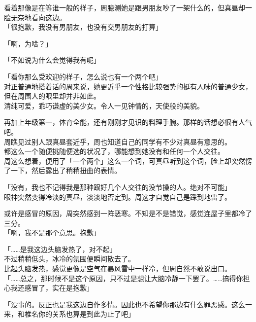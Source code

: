 看着那像是在等谁一般的样子，周臆测她是跟男朋友吵了一架什么的，但真昼却一脸无奈地看向这边。\\

「很抱歉，我没有男朋友，也没有交男朋友的打算」

「啊，为啥？」

「不如说为什么会觉得我有呢」

「看你那么受欢迎的样子，怎么说也有一个两个吧」\\

对正普通地搭着话的周来说，她更近乎一个性格比较强势的挺有人味的普通少女，但在周围人的眼里却并非如此。\\

清纯可爱，乖巧谦虚的美少女。令人一见钟情的，天使般的美貌。

再加上年级第一，体育全能，还有刚刚才见识的料理手腕。那样的话想必很有人气吧。\\

周瞧见过别人跟真昼套近乎，周也知道自己的同学有不少对真昼有意思的。\\

都这么一个随便挑随便选的状况了，哪能想到她没有和任何一个人交往。\\

周这么想着，便用了「一个两个」这么一个词，可真昼听到这个词，脸上却突然愣了一下，然后露出了稍稍扭曲的表情。

「没有，我也不记得我是那种跟好几个人交往的没节操的人。绝对不可能」\\

眼神突然变得冷淡的真昼，淡淡地否定到。周这才自觉自己是踩到地雷了。

或许是感冒的原因，周突然感到一阵恶寒。不知是不是错觉，感觉连屋子里都冷了三分。\\

「啊，我不是那个意思。抱歉」

「……是我这边头脑发热了，对不起」\\

不过稍稍低头，冰冷的氛围便瞬间散去了。\\

比起头脑发热，感觉更像是空气在暴风雪中一样冷，但周自然不敢说出口。\\

「……总之，那时候不是这个原因，只不过是想让大脑冷静一下罢了。……搞得你担心我还感冒了，实在是抱歉」

「没事的。反正也是我这边自作多情。因此也不希望你那边有什么罪恶感。这么一来，和椎名你的关系也算是到此为止了吧」\\

